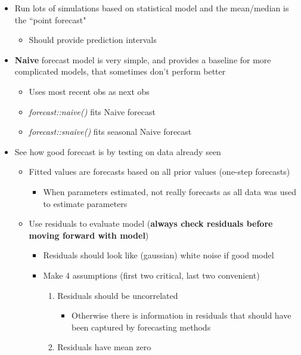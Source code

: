 \documentclass{article}\usepackage[]{graphicx}\usepackage[]{color}
\begin{document}
\begin{itemize}
    \item Run lots of simulations based on statistical model and the mean/median is the ``point forecast"
    \begin{itemize}
        \item Should provide prediction intervals
    \end{itemize}
    \item \textbf{Naive} forecast model is very simple, and provides a baseline for more complicated models, that sometimes don't perform better
    \begin{itemize}
        \item Uses most recent obs as next obs
        \item \textit{forecast::naive()} fits Naive forecast
        \item \textit{forecast::snaive()} fits seasonal Naive forecast
    \end{itemize}
    \item See how good forecast is by testing on data already seen
    \begin{itemize}
        \item Fitted values are forecasts based on all prior values (one-step forecasts)
        \begin{itemize}
            \item When parameters estimated, not really forecasts as all data was used to estimate parameters
        \end{itemize}
        \item Use residuals to evaluate model (\textbf{always check residuals before moving forward with model})
        \begin{itemize}
            \item Residuals should look like (gaussian) white noise if good model
            \item Make 4 assumptions (first two critical, last two convenient)
            \begin{enumerate}
                \item Residuals should be uncorrelated
                    \begin{itemize}
                        \item Otherwise there is information in residuals that should have been captured by forecasting methods
                    \end{itemize}
                \item Residuals have mean zero

\end{enumerate}
\end{itemize}
\end{itemize}
\end{itemize}
\end{document}
